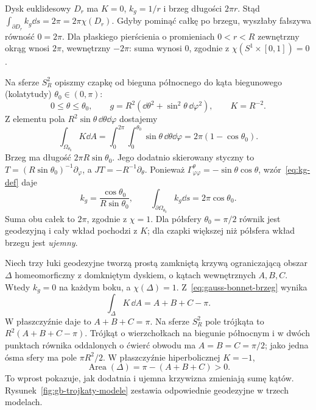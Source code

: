 \begin{przyklad}
\label{prz:gb-dysk-czapka}
Dysk euklidesowy $D_r$ ma $K=0$, $k_g=1/r$ i brzeg
długości $2\pi r$. Stąd
$\int_{\partial D_r} k_g\dd s=2\pi=2\pi\chi(D_r)$.
Gdyby pominąć całkę po brzegu, wyszłaby fałszywa
równość $0=2\pi$. Dla płaskiego pierścienia o
promieniach $0<r<R$ zewnętrzny okrąg wnosi $2\pi$,
wewnętrzny $-2\pi$: suma wynosi $0$, zgodnie z
$\chi(S^1\times[0,1])=0$.

Na sferze $S_R^2$ opiszmy czapkę od bieguna północnego
do kąta biegunowego (kolatytudy) $\theta_0\in(0,\pi)$:
\[
 0\leq\theta\leq\theta_0,\qquad
 g=R^2(\dd\theta^2+\sin^2\theta\,\dd\varphi^2),
 \qquad K=R^{-2}.
\]
Z elementu pola $R^2\sin\theta\,\dd\theta\dd\varphi$
dostajemy
\[
 \int_{\Omega_{\theta_0}}K\dd A
 =\int_0^{2\pi}\int_0^{\theta_0}\sin\theta
                                     \,\dd\theta\dd\varphi
 =2\pi(1-\cos\theta_0).
\]
Brzeg ma długość $2\pi R\sin\theta_0$. Jego dodatnio
skierowany styczny to $T=(R\sin\theta_0)^{-1}
\partial_\varphi$, a $JT=-R^{-1}\partial_\theta$.
Ponieważ $\Gamma^\theta_{\varphi\varphi}
=-\sin\theta\cos\theta$, wzór~\eqref{eq:kg-def} daje
\[
 k_g=\frac{\cos\theta_0}{R\sin\theta_0},
 \qquad \int_{\partial\Omega_{\theta_0}}k_g\dd s
 =2\pi\cos\theta_0.
\]
Suma obu całek to $2\pi$, zgodnie z $\chi=1$.
Dla półsfery $\theta_0=\pi/2$ równik jest geodezyjną
i cały wkład pochodzi z $K$; dla czapki większej
niż półsfera wkład brzegu jest \emph{ujemny}.
\end{przyklad}

\begin{przyklad}
\label{prz:gb-trojkat}
Niech trzy łuki geodezyjne tworzą prostą zamkniętą krzywą
ograniczającą obszar $\Delta$ homeomorficzny z domkniętym
dyskiem, o kątach wewnętrznych $A,B,C$.
Wtedy $k_g=0$ na każdym boku, a $\chi(\Delta)=1$.
Z~\eqref{eq:gauss-bonnet-brzeg} wynika
\begin{equation}\label{eq:gb-trojkat}
 \int_\Delta K\,\dd A=A+B+C-\pi.
\end{equation}
W płaszczyźnie daje to $A+B+C=\pi$. Na sferze
$S_R^2$ pole trójkąta to
$R^2(A+B+C-\pi)$. Trójkąt o wierzchołkach
na biegunie północnym i w dwóch punktach równika
oddalonych o ćwierć obwodu ma $A=B=C=\pi/2$;
jako jedna ósma sfery ma pole $\pi R^2/2$.
W płaszczyźnie hiperbolicznej $K=-1$,
\[
 \operatorname{Area}(\Delta)=\pi-(A+B+C)>0.
\]
To wprost pokazuje, jak dodatnia i ujemna krzywizna
zmieniają sumę kątów.
Rysunek~\ref{fig:gb-trojkaty-modele} zestawia
odpowiednie geodezyjne w trzech modelach.
\end{przyklad}

